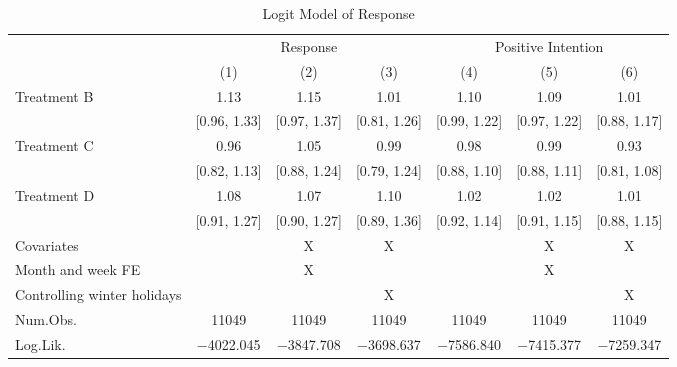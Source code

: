 \documentclass[12pt, a4paper]{article}
\begin{document}
\begin{landscape}\begin{table}[H]

\caption{\label{tab:reply-logit}Logit Model of Response}
\centering
\fontsize{8}{10}\selectfont
\begin{threeparttable}
\begin{tabular}[t]{lcccccc}
\toprule
\multicolumn{1}{c}{ } & \multicolumn{3}{c}{Response} & \multicolumn{3}{c}{Positive Intention} \\
\cmidrule(l{3pt}r{3pt}){2-4} \cmidrule(l{3pt}r{3pt}){5-7}
  & (1) & (2) & (3) & (4) & (5) & (6)\\
\midrule
Treatment B & \num{1.13} & \num{1.15} & \num{1.01} & \num{1.10} & \num{1.09} & \num{1.01}\\
 & {}[\num{0.96}, \num{1.33}] & {}[\num{0.97}, \num{1.37}] & {}[\num{0.81}, \num{1.26}] & {}[\num{0.99}, \num{1.22}] & {}[\num{0.97}, \num{1.22}] & {}[\num{0.88}, \num{1.17}]\\
Treatment C & \num{0.96} & \num{1.05} & \num{0.99} & \num{0.98} & \num{0.99} & \num{0.93}\\
 & {}[\num{0.82}, \num{1.13}] & {}[\num{0.88}, \num{1.24}] & {}[\num{0.79}, \num{1.24}] & {}[\num{0.88}, \num{1.10}] & {}[\num{0.88}, \num{1.11}] & {}[\num{0.81}, \num{1.08}]\\
Treatment D & \num{1.08} & \num{1.07} & \num{1.10} & \num{1.02} & \num{1.02} & \num{1.01}\\
 & {}[\num{0.91}, \num{1.27}] & {}[\num{0.90}, \num{1.27}] & {}[\num{0.89}, \num{1.36}] & {}[\num{0.92}, \num{1.14}] & {}[\num{0.91}, \num{1.15}] & {}[\num{0.88}, \num{1.15}]\\
\midrule
Covariates &  & X & X &  & X & X\\
Month and week FE &  & X &  &  & X & \\
Controlling winter holidays &  &  & X &  &  & X\\
Num.Obs. & \num{11049} & \num{11049} & \num{11049} & \num{11049} & \num{11049} & \num{11049}\\
Log.Lik. & \num{-4022.045} & \num{-3847.708} & \num{-3698.637} & \num{-7586.840} & \num{-7415.377} & \num{-7259.347}\\
\bottomrule
\end{tabular}
\begin{tablenotes}

\end{tablenotes}
\end{threeparttable}
\end{table}
\end{landscape}
\end{document}
